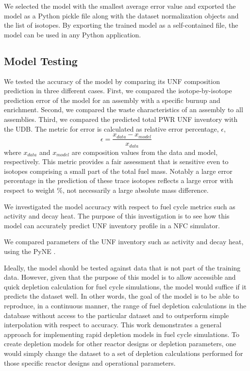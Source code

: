 We selected the model with the smallest average error value
and exported the model as a Python
pickle file along with the dataset normalization objects and 
the list of isotopes. By exporting the trained model
as a self-contained file, the model can be used in any Python
application.


\subsection{Model Testing}

We tested the accuracy of the model by comparing
its \gls{UNF} composition prediction
in three different cases. First, we compared the
isotope-by-isotope prediction error of the model for an
assembly with a specific burnup and enrichment.
Second, we compared the waste characteristics of
an assembly to all assemblies. Third, we compared
the predicted total \gls{PWR} \gls{UNF} inventory with the
\gls{UDB}. The metric for error is calculated as
relative error percentage, $\epsilon$,
\begin{equation}
\epsilon = \frac{x_{data} - x_{model}}{x_{data}}
\end{equation}
where $x_{data}$ and $x_{model}$ are composition values
from the data and model, respectively.
This metric provides a fair assessment 
that is sensitive even to isotopes comprising a small
part of the total fuel mass.
Notably a large error percentage in the
prediction of these trace isotopes reflects a large
error with respect to weight \%, not necessarily a large absolute
mass difference.


We investigated the model accuracy with respect to fuel
cycle metrics such as activity and decay heat. The purpose
of this investigation is to see how this model can accurately
predict \gls{UNF} inventory profile in a \gls{NFC} simulator.

We compared parameters of the \gls{UNF} inventory
such as activity and decay heat, using the
\gls{PyNE} \cite{scopatz_pyne:_2012}. 

Ideally, the model should be tested against data
that is not part of the training data. However, given
that the purpose of this model is to allow accessible and
quick depletion calculation for
fuel cycle simulations, the model would suffice if
it predicts the dataset well. In other words, the
goal of the model is to be able to reproduce,
in a continuous manner, the range of fuel depletion
calculations in the database without access to the particular dataset
and to outperform simple interpolation with respect to accuracy.
This work
demonstrates a general approach for implementing
rapid depletion models in fuel cycle simulations.
To create depletion models for other reactor designs or depletion parameters,
one would simply change the dataset to a set of depletion calculations performed
for those specific reactor designs and operational parameters. 


